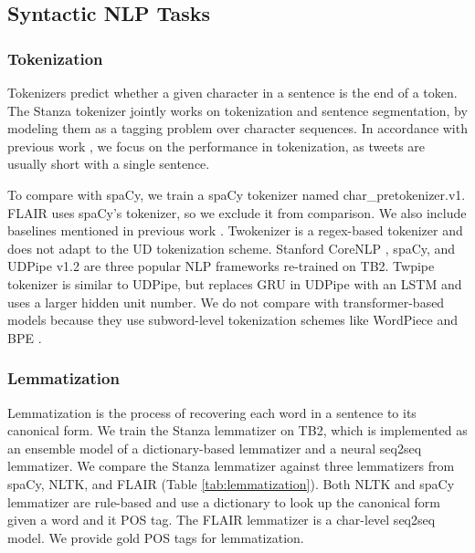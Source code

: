 \documentclass[10pt, a4paper]{article}
\begin{document}
\subsection{Syntactic NLP Tasks}
\subsubsection{Tokenization}

Tokenizers predict whether a given character in a sentence is the end of a token. The Stanza tokenizer jointly works on tokenization and sentence segmentation, by modeling them as a tagging problem over character sequences.  In accordance with previous work \cite{gimpel2010part,liu2018parsing}, we focus on the performance in tokenization, as tweets are usually short with a single sentence. 

To compare with spaCy, we train a spaCy tokenizer named char\_pretokenizer.v1. FLAIR uses spaCy's tokenizer, so we exclude it from comparison. We also include baselines mentioned in previous work \cite{kong2014dependency,liu2018parsing}. Twokenizer \cite{o2010tweetmotif} is a regex-based tokenizer and does not adapt to the UD tokenization scheme. Stanford CoreNLP \cite{manning2014stanford}, spaCy, and UDPipe v1.2 \cite{straka2017tokenizing} are three popular NLP frameworks re-trained on TB2. Twpipe tokenizer \cite{liu2018parsing} is similar to UDPipe, but replaces GRU in UDPipe with an LSTM and uses a larger hidden unit number. We do not compare with transformer-based models because they use subword-level tokenization schemes like WordPiece \cite{wu2016google} and BPE \cite{sennrich2015neural}. 



\subsubsection{Lemmatization}

Lemmatization is the process of recovering each word in a sentence to its canonical form. We train the Stanza lemmatizer on TB2, which is implemented as an ensemble model of a dictionary-based lemmatizer and a neural seq2seq lemmatizer. We compare the Stanza lemmatizer against three lemmatizers from spaCy, NLTK, and FLAIR (Table \ref{tab:lemmatization}). Both NLTK and spaCy lemmatizer are rule-based and use a dictionary to look up the canonical form given a word and it POS tag. The FLAIR lemmatizer is a char-level seq2seq model. We provide gold POS tags for lemmatization.
\end{document}
